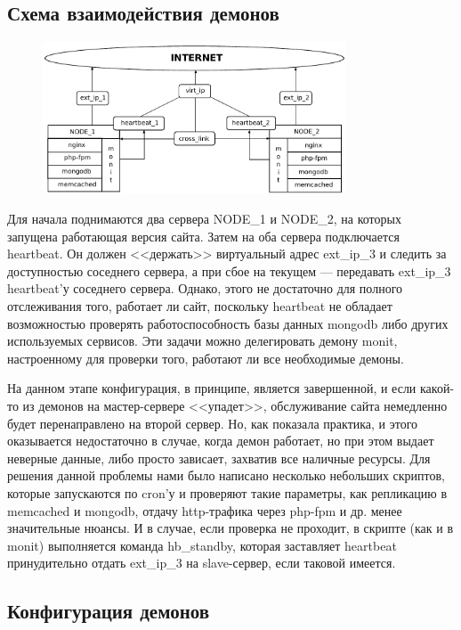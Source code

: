 \documentclass[10pt, a5paper]{article}
\begin{document}
\subsection*{Схема взаимодействия демонов}

\begin{figure}[h!]
  \centering
  \includegraphics[width=9cm]{01_2012_heartbeat}
  \label{fig:Volkovich1}
\end{figure}

Для начала поднимаются два сервера NODE\_1 и NODE\_2, на которых запущена работающая версия сайта. Затем на оба сервера подключается heartbeat. Он должен <<держать>> виртуальный адрес ext\_ip\_3 и следить за доступностью соседнего сервера, а при сбое на текущем --- передавать ext\_ip\_3 heartbeat'у соседнего сервера. Однако, этого не достаточно для полного отслеживания того, работает ли сайт, поскольку heartbeat не обладает возможностью проверять работоспособность базы данных mongodb либо других используемых сервисов. Эти задачи можно делегировать демону monit, настроенному для проверки того, работают ли все необходимые демоны.

На данном этапе конфигурация, в принципе, является завершенной, и если какой-то из демонов на мастер-сервере <<упадет>>, обслуживание сайта немедленно будет перенаправлено на второй сервер. Но, как показала практика, и этого оказывается недостаточно в случае, когда демон работает, но при этом выдает неверные данные, либо просто зависает, захватив все наличные ресурсы. Для решения данной проблемы нами было написано несколько небольших скриптов, которые запускаются по cron'у и проверяют такие параметры, как репликацию в memcached и mongodb, отдачу http-трафика через php-fpm и др. менее значительные нюансы. И в случае, если проверка не проходит, в скрипте (как и в monit) выполняется команда hb\_standby, которая заставляет heartbeat принудительно отдать ext\_ip\_3 на slave-сервер, если таковой имеется.

\subsection*{Конфигурация демонов}
\end{document}
